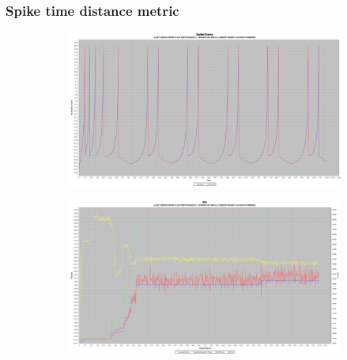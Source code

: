\documentclass[10pt]{article}
\begin{document}
		\subsubsection{Spike time distance metric}
			\begin{figure}[H]
				\centering
					\begin{subfigure}{.5\textwidth}
						\centering
						\includegraphics[width=\linewidth]{./../images/izzy2/time/plot.png}
						
						\label{fig:sub4a}
					\end{subfigure}%
					\begin{subfigure}{.5\textwidth}
						\centering
						\includegraphics[width=\linewidth]{./../images/izzy2/time/prog.png}
						
						\label{fig:sub4b}
					\end{subfigure}
					
					\label{fig:plot4}
			\end{figure}
			
\end{document}
